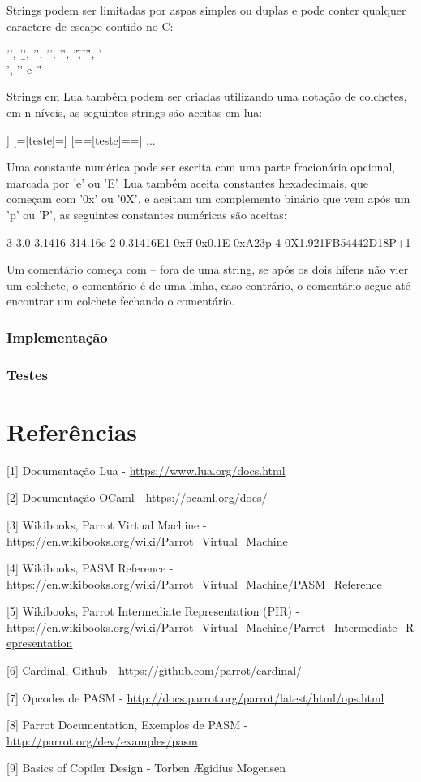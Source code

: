\documentclass[12pt,a4paper,twoside]{report}
\begin{document}
Strings podem ser limitadas por aspas simples ou duplas e pode conter qualquer caractere de escape contido no C:

\begin{terminal}
 '\a', '\b', '\f', '\n', '\r', '\t', '\v', '\\', '\"' e '\''
\end{terminal}

Strings em Lua também podem ser criadas utilizando uma notação de colchetes, em n níveis, as seguintes strings são aceitas em lua:

\begin{terminal}
 [[teste]] [=[teste]=] [==[teste]==] ...
\end{terminal}

Uma constante numérica pode ser escrita com uma parte fracionária opcional, marcada por 'e' ou 'E'. Lua também aceita constantes hexadecimais, que começam com '0x' ou '0X', e aceitam um complemento binário que vem após um 'p' ou 'P', as seguintes constantes numéricas são aceitas:

\begin{terminal}
 3     3.0     3.1416     314.16e-2     0.31416E1
 0xff  0x0.1E  0xA23p-4   0X1.921FB54442D18P+1
\end{terminal}

Um comentário começa com -- fora de uma string, se após os dois hífens não vier um colchete, o comentário é de uma linha, caso contrário, o comentário segue até encontrar um colchete fechando o comentário.

\subsection{Implementação}
\subsection{Testes}


\chapter{Referências}
[1] Documentação Lua - \url{https://www.lua.org/docs.html}

[2] Documentação OCaml - \url{https://ocaml.org/docs/}

[3] Wikibooks, Parrot Virtual Machine - \url{https://en.wikibooks.org/wiki/Parrot_Virtual_Machine}

[4] Wikibooks, PASM Reference - \url{https://en.wikibooks.org/wiki/Parrot_Virtual_Machine/PASM_Reference}

[5] Wikibooks, Parrot Intermediate Representation (PIR) - \url{https://en.wikibooks.org/wiki/Parrot_Virtual_Machine/Parrot_Intermediate_Representation}

[6] Cardinal, Github - \url{https://github.com/parrot/cardinal/}

[7] Opcodes de PASM - \url{http://docs.parrot.org/parrot/latest/html/ops.html}

[8] Parrot Documentation, Exemplos de PASM - \url{http://parrot.org/dev/examples/pasm}

[9] Basics of Copiler Design - Torben Ægidius Mogensen

\clearpage
{}
\appendix
\end{document}

